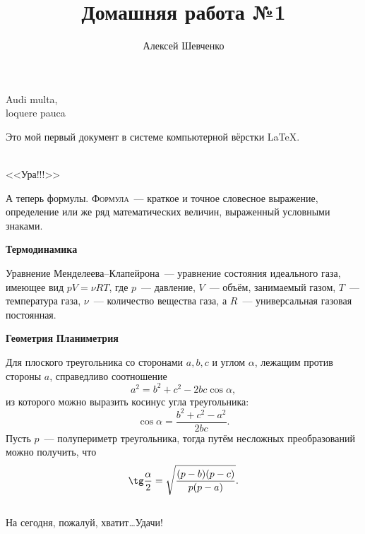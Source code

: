 \documentclass[12pt]{article}
\title{Домашняя работа №1}
\author{Алексей Шевченко}
\date{}
\begin{document}
	\maketitle

	\begin{flushright}
	    Audi multa,\\ loquere pauca \\[20pt]
	\end{flushright}

	Это мой первый документ в системе компьютерной вёрстки \LaTeX .\\ \\
	\begin{center}
	    <<\textsf{\LARGE{Ура!!!}}>>
	\end{center} \par
	А теперь формулы. \textsc{Формула}~--- краткое и точное словесное выражение, определение или же ряд математических величин, выраженный условными знаками.\vspace{15pt} \par
	\hspace{14pt} \textbf{\large{Термодинамика}} \par 
	Уравнение Менделеева--Клапейрона~--- уравнение состояния идеального газа, имеющее вид $pV=\nu RT$, где $p$~--- давление, $V$~--- объём, занимаемый газом, $T$~--- температура газа, $\nu$~--- количество вещества газа, а $R$~--- универсальная газовая постоянная.\vspace{15pt} \par
	\hspace{14pt} \textbf{\large{Геометрия}} \hfill \textbf{\large{Планиметрия}} \par
	Для плоского треугольника со сторонами $a, b, c$ и углом $\alpha$, лежащим против стороны $a$, справедливо соотношение $$a^2=b^2 + c^2 - 2bc\cos \alpha,$$ из которого можно выразить косинус угла треугольника:
	$$\cos \alpha = \frac{b^2+c^2-a^2}{2bc}.$$
	\hspace{14pt} Пусть $p$~--- полупериметр треугольника, тогда путём несложных преобразований можно получить, что 
	$$\tg \frac{\alpha}{2}=\sqrt{\frac{(p-b)(p-c)}{p(p-a)}}.$$
	\vspace{1cm} \\ На сегодня, пожалуй, хватит\dots Удачи!
\end{document}
